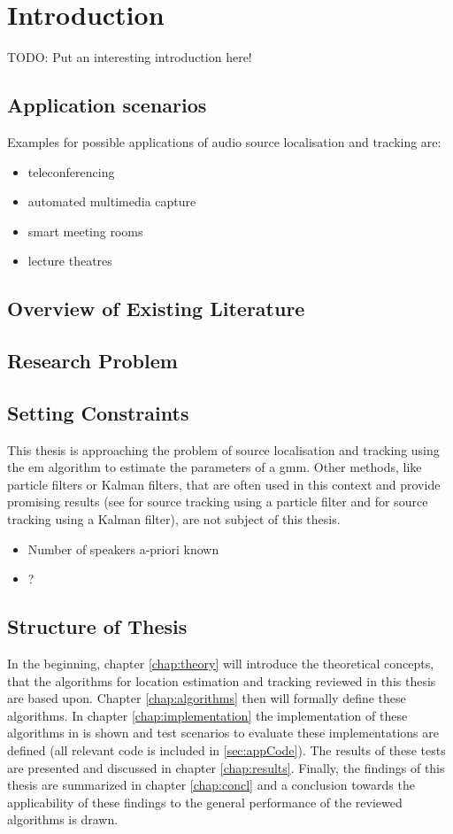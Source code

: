 \chapter{Introduction}
TODO: Put an interesting introduction here!
\section{Application scenarios}
Examples for possible applications of audio source localisation and tracking are:
\begin{itemize}
\setlength\itemsep{0cm}
	\item teleconferencing
	\item automated multimedia capture
	\item smart meeting rooms
	\item lecture theatres \cite{Lehmann2007}
\end{itemize}

\section{Overview of Existing Literature}
\section{Research Problem}
\section{Setting Constraints}
This thesis is approaching the problem of source localisation and tracking using the \gls{em} algorithm to estimate the parameters of a \gls{gmm}. Other methods, like particle filters or Kalman filters, that are often used in this context and provide promising results (see \cite{Lehmann2007} for source tracking using a particle filter and \cite{Gannot2012} for source tracking using a Kalman filter), are not subject of this thesis.
\begin{itemize}
	\item Number of speakers a-priori known
	\item ?
\end{itemize}
\section{Structure of Thesis}
	In the beginning, chapter \ref{chap:theory} will introduce the theoretical concepts, that the algorithms for location estimation and tracking reviewed in this thesis are based upon. Chapter \ref{chap:algorithms} then will formally define these algorithms. In chapter \ref{chap:implementation} the implementation of these algorithms in \matlab is shown and test scenarios to evaluate these implementations are defined (all relevant code is included in \ref{sec:appCode}). The results of these tests are presented and discussed in chapter \ref{chap:results}. Finally, the findings of this thesis are summarized in chapter \ref{chap:concl} and a conclusion towards the applicability of these findings to the general performance of the reviewed algorithms is drawn.
